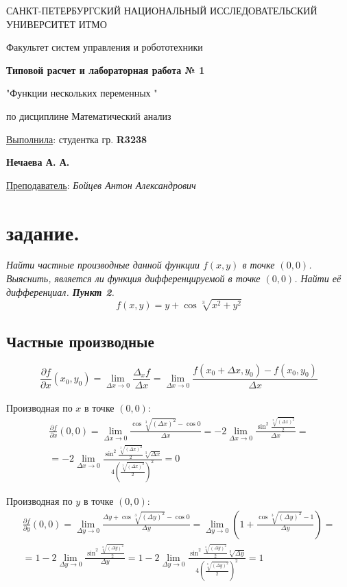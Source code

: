 \documentclass[a5paper, 10pt]{article}
\theoremstyle{definition}
\theoremstyle{plain}
\theoremstyle{remark}
\newcommand*{\titlePage}{
	\thispagestyle{title}
	\begingroup
	\begin{center}
		\vspace*{6ex}
		
		{\small
			САНКТ-ПЕТЕРБУРГСКИЙ НАЦИОНАЛЬНЫЙ ИССЛЕДОВАТЕЛЬСКИЙ УНИВЕРСИТЕТ ИТМО	
		}
		
		\vspace*{2ex}
		
		{\normalsize
			Факультет систем управления и робототехники
		}
		
		\vspace*{15ex}
		
		{\Large \bfseries 
			Типовой расчет и лабораторная работа № 1
		}
\vspace*{2ex}
	{\Large \bfseries 
			
"Функции нескольких переменных "
		}
\vspace*{2ex}
		
		{\normalsize
			по дисциплине Математический анализ
		}

	\end{center}
	\vspace*{20ex}
	\begin{flushright}
		{\large 
			\underline{Выполнила}: студентка гр. \textbf{R3238}\\
			\begin{flushright}
				\textbf{Нечаева А. А.}\\
			\end{flushright}
		}
		
		\vspace*{5ex}
		
		{\large 
			\underline{Преподаватель}: \textit{Бойцев Антон Александрович}
		}
	\end{flushright}	
	\newpage
	\setcounter{page}{1}
	\endgroup}
\begin{document}
	\titlePage
	\pagestyle{style}
\newpage

\section{задание.}
\textit{Найти частные производные данной функции $f(x, y)$ в точке $(0, 0)$. Выяснить, является ли функция дифференцируемой в точке $(0, 0)$. Найти её дифференциал. \textbf{Пункт 2}.}
\begin{equation}
f(x, y) = y + \cos \sqrt[3]{x^2 + y^2}
\end{equation}
\subsection{Частные производные}

\begin{equation}
\frac{\partial f}{\partial x} (x_0, y_0) = \lim_{\Delta x \to 0} \frac{\Delta_x f}{\Delta x} = \lim_{\Delta x \to 0} \frac{f ( x_0 + \Delta x, y_0) - f(x_0, y_0)}{\Delta x}
\end{equation}
\\

Производная по $x$ в точке $(0, 0)$:
\begin{multline}
\frac{\partial f}{\partial x} (0, 0) = \lim_{\Delta x \to 0} \frac{\cos \sqrt[3]{( \Delta x)^2} - \cos 0}{\Delta x} = 
-2 \lim_{\Delta x \to 0} \frac{\sin^2  \frac{ \sqrt[3]{( \Delta x)^2}}{2}}{\Delta x} =\\
= -2 \lim_{\Delta x \to 0} \frac{\sin^2  \frac{ \sqrt[3]{( \Delta x)^2}}{2} \sqrt[3]{ \Delta x}}{4 \left(\frac{ \sqrt[3]{( \Delta x)^2}}{2} \right)^2} = 0
\end{multline}


Производная по $y$ в точке $(0, 0)$:
\begin{multline}
\frac{\partial f}{\partial y} (0, 0) = \lim_{\Delta y \to 0} \frac{\Delta y + \cos \sqrt[3]{( \Delta y)^2} - \cos 0}{\Delta y} = 
\lim_{\Delta y \to 0} \left(1 +  \frac{\cos \sqrt[3]{( \Delta y)^2} - 1}{\Delta y} \right) =\\
= 1 - 2 \lim_{\Delta y \to 0} \frac{\sin^2  \frac{ \sqrt[3]{( \Delta y)^2}}{2}}{\Delta y} 
=1 -2 \lim_{\Delta y \to 0} \frac{\sin^2  \frac{ \sqrt[3]{( \Delta y)^2}}{2} \sqrt[3]{ \Delta y}}{4 \left(\frac{ \sqrt[3]{( \Delta y)^2}}{2} \right)^2} = 1
\end{multline}
\end{document}
